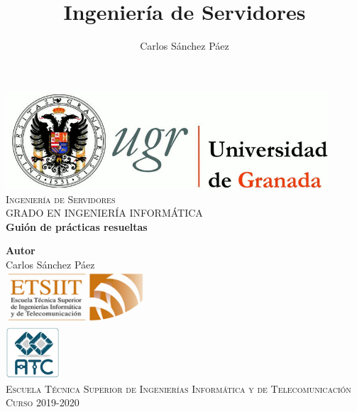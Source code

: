\documentclass[12pt,spanish]{article}
\title{Ingeniería de Servidores}
\author{Carlos Sánchez Páez}
\begin{document}
\lstset{columns=fullflexible,basicstyle=\ttfamily}


\begin{titlepage}

 \newlength{\centeroffset}
 \setlength{\centeroffset}{-0.5\oddsidemargin}
 \addtolength{\centeroffset}{0.5\evensidemargin}
 \thispagestyle{empty}

 \noindent\hspace*{\centeroffset}
 \begin{minipage}{\textwidth}

  \centering
  \includegraphics[width=0.9\textwidth]{logo_ugr.jpg}\\[1.4cm]

  \textsc{ \Large Ingeniería de Servidores\\[0.2cm]}
  \textsc{GRADO EN INGENIERÍA INFORMÁTICA}\\[1cm]

  {\Huge\bfseries Guión de prácticas resueltas\\}
 \end{minipage}

 \vspace{1.5cm}
 \noindent\hspace*{\centeroffset}
 \begin{minipage}{\textwidth}
  \centering

  \textbf{Autor}\\ {Carlos Sánchez Páez}\\[2.5ex]
  \includegraphics[width=0.4\textwidth]{etsiit_logo.png}\\[0.1cm]
  \vspace{1.5cm}
  \includegraphics[width=0.15\textwidth]{atc.jpg}\\[0.1cm]
  \vspace{1cm}
  \textsc{Escuela Técnica Superior de Ingenierías Informática y de Telecomunicación}\\
  \vspace{1cm}
  \textsc{Curso 2019-2020}
 \end{minipage}
\end{titlepage}
\thispagestyle{empty}
\newpage
\tableofcontents{}
\newpage
\listoffigures
\thispagestyle{empty}
\newpage
\end{document}
